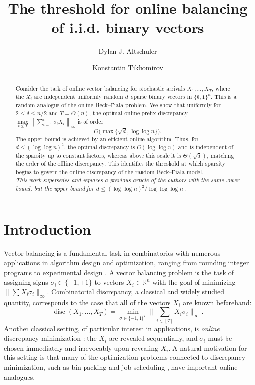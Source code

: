 \documentclass[reqno,english]{amsart}
\title{The threshold for online balancing of i.i.d. binary vectors}
\author[D. J. Altschuler]{Dylan J. Altschuler}
\author[K. Tikhomirov]{Konstantin Tikhomirov}
\newcommand*{\RR}{\mathbb R}
\newcommand*{\disc}{\operatorname{disc}}
\theoremstyle{definition}
\begin{document}
\begin{abstract}
Consider the task of online vector balancing for stochastic arrivals
$X_1,\ldots,{X_T}$, where the $X_i$ are independent uniformly random
$d$--sparse binary vectors in $\{0,1\}^n$. This is a random analogue of the online Beck--Fiala problem.  We show that uniformly for
$2\le d\le n/2$ and $T = \Theta(n)$, the optimal online prefix discrepancy
$\max\limits_{t\leq T}\left\|\sum_{i=1}^t\sigma_i X_i\right\|_\infty$
is of order
\[
    \Theta\big(\max\{\sqrt d,\log\log n\}\big).
\]
The upper bound is achieved by an efficient online
algorithm. Thus, for $d\le(\log\log n)^2$, the optimal discrepancy is
$\Theta(\log\log n)$ and is independent of the sparsity up to constant
factors, whereas above this scale it is $\Theta(\sqrt d)$, matching the order
of the offline discrepancy.  This identifies the threshold at which sparsity
begins to govern the online discrepancy of the random Beck--Fiala model. \\

\textit{This work supersedes and replaces a previous article of the authors with the same lower bound, but the upper bound for $d \le (\log \log n)^2/\log\log\log n$} \cite{AT-old}.
\end{abstract}

\maketitle

\section{Introduction}
Vector balancing is a fundamental task in combinatorics with numerous applications in algorithm design and optimization, ranging from rounding integer programs to experimental design \cite{beck-fiala,experimental-design}. A vector balancing problem is the task of assigning signs $\sigma_i \in \{-1,+1\}$ to vectors $X_i \in \RR^n$ with the goal of minimizing $\|\sum X_i\sigma_i\|_\infty$. Combinatorial discrepancy, a classical and widely studied quantity, corresponds to the case that all of the vectors $X_i$ are known beforehand:
\[
    \disc(X_1,\dots,X_T) = \min_{\sigma \in \{-1,1\}^T}\Big\|\sum_{i \in [T]} X_i \sigma_i\Big\|_\infty \,.
\]
Another classical setting, of particular interest in applications, is \textit{online} discrepancy minimization \cite{spencer-online}: the $X_i$ are revealed sequentially, and $\sigma_i$ must be chosen immediately and irrevocably upon revealing $X_i$. A natural motivation for this setting is that many of the optimization problems connected to discrepancy minimization, such as bin packing and job scheduling \cite{bin}, have important online analogues. 
\end{document}
